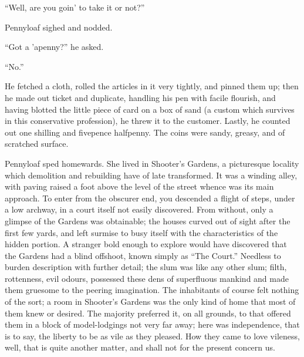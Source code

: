 ``Well, are you goin' to take it or not?''

Pennyloaf sighed and nodded.

``Got a 'apenny?'' he asked.

``No.''

He fetched a cloth, rolled the articles in it very tightly, and pinned
them up; then he made out ticket and duplicate, handling his pen with
facile flourish, and having blotted the little piece of card on a box of
sand (a custom which survives in this conservative profession), he threw
it to the customer. Lastly, he counted out one shilling and fivepence
halfpenny. The coins were sandy, greasy, and of scratched surface.

{\protect\hypertarget{178}{}{}}Pennyloaf sped homewards. She lived in
Shooter's Gardens, a picturesque locality which demolition and
rebuilding have of late transformed. It was a winding alley, with paving
raised a foot above the level of the street whence was its main
approach. To enter from the obscurer end, you descended a flight of
steps, under a low archway, in a court itself not easily discovered.
From without, only a glimpse of the Gardens was obtainable; the houses
curved out of sight after the first few yards, and left surmise to busy
itself with the characteristics of the hidden portion. A stranger bold
enough to explore would have discovered that the Gardens had a blind
offshoot, known simply as ``The Court.'' Needless to burden description
with further detail; the slum was like any other slum; filth,
rottenness, evil odours, possessed these dens of superfluous mankind and
made them gruesome to the peering imagination. The inhabitants of course
felt nothing of the sort; a room in Shooter's Gardens was the only kind
of home that {\protect\hypertarget{179}{}{}}most of them knew or
desired. The majority preferred it, on all grounds, to that offered them
in a block of model-lodgings not very far away; here was independence,
that is to say, the liberty to be as vile as they pleased. How they came
to love vileness, well, that is quite another matter, and shall not for
the present concern us.

